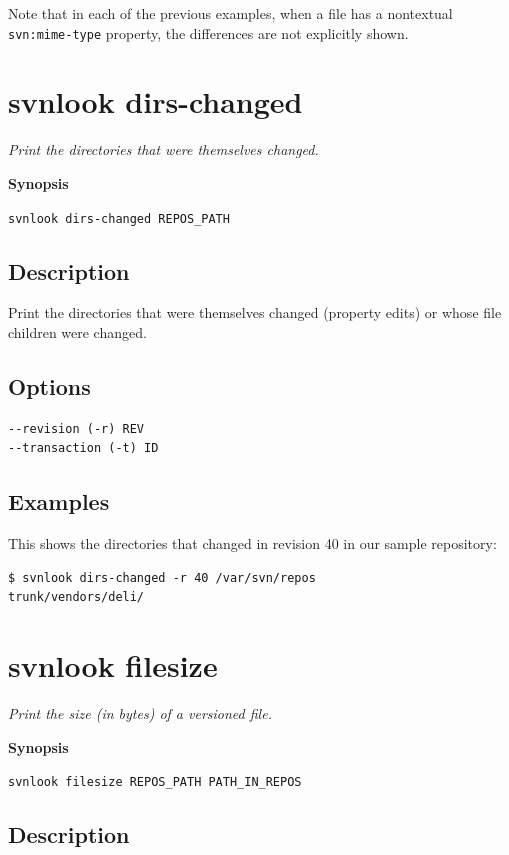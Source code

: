 Note that in each of the previous examples, when a file has a nontextual
\texttt{svn:mime-type} property, the differences are not explicitly
shown.

\section{svnlook dirs-changed}\label{svn.ref.svnlook.c.dirs-changed}

\emph{Print the directories that were themselves changed.}

\textbf{Synopsis}

\texttt{svnlook\ dirs-changed\ REPOS\_PATH}

\subsection{Description}

Print the directories that were themselves changed (property edits) or
whose file children were changed.

\subsection{Options}

\begin{verbatim}
--revision (-r) REV
--transaction (-t) ID
\end{verbatim}

\subsection{Examples}

This shows the directories that changed in revision 40 in our sample
repository:

\begin{verbatim}
$ svnlook dirs-changed -r 40 /var/svn/repos
trunk/vendors/deli/
\end{verbatim}

\section{svnlook filesize}\label{svn.ref.svnlook.c.filesize}

\emph{Print the size (in bytes) of a versioned file.}

\textbf{Synopsis}

\texttt{svnlook\ filesize\ REPOS\_PATH\ PATH\_IN\_REPOS}

\subsection{Description}


